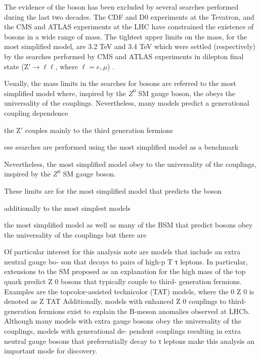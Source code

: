 The evidence of the \Zprime boson has been excluded by several searches performed during the last two decades. The 
CDF and D0 experiments at the Tevatron, and the CMS and ATLAS experiments at the LHC have  constrained the 
existence of \Zprime bosons in a wide range of mass. The tightest upper limits on the \Zprime mass, for the most simplified model, are
3.2 TeV and 3.4 TeV which were settled (respectively) by the searches performed by CMS and ATLAS experiments in dilepton final 
state (Z$'\rightarrow \ell\ell$, where $\ell=e, \mu$) \cite{CMSZprime2dileptonbib,ATLASZprime2dileptonbib}. 


Usually, the
mass limits in the searches for \Zprime bosons are referred to the most simplified model where, inspired by the $Z^{0}$ SM gauge boson, the
\Zprime obeys the universality of the couplings. Nevertheless, many models predict a generational coupling dependence 

the Z$'$ couples mainly to the third generation fermions


ese searches 
are performed using the most simplified model as a benchmark 

Nevertheless, the most simplified model obey to the universality of the couplings, inspired by the $Z^{0}$ SM gauge boson. 

These limits 
are for the most simplified model that predicts the \Zprime boson




additionally to the most simplest models 

the most simplified model as well as many of the BSM that predict \Zprime bosons obey the universality 
of the couplings but there are 



Of particular interest for this analysis note are models that include an extra neutral gauge bo-
son that decays to pairs of high-p T τ leptons. In particular, extensions to the SM proposed as an
explanation for the high mass of the top quark predict Z 0 bosons that typically couple to third-
generation fermions. Examples are the topcolor-assisted technicolor (TAT) models, where the
0
Z 0 is denoted as Z TAT
Additionally, models with enhanced Z 0 couplings to third-generation
fermions exist to explain the B-meson anomalies observed at LHCb. Although many models
with extra gauge bosons obey the universality of the couplings, models with generational de-
pendent couplings resulting in extra neutral gauge bosons that preferentially decay to τ leptons
make this analysis an important mode for discovery.


